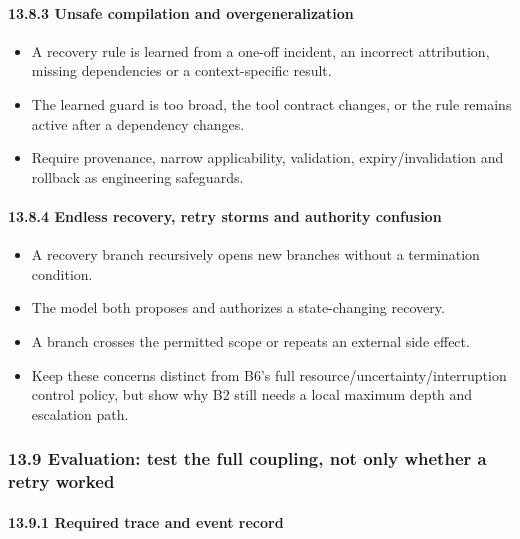 \paragraph{13.8.3 Unsafe compilation and overgeneralization}\label{unsafe-compilation-and-overgeneralization}

\begin{itemize}
\tightlist
\item
  A recovery rule is learned from a one-off incident, an incorrect attribution, missing dependencies or a context-specific result.
\item
  The learned guard is too broad, the tool contract changes, or the rule remains active after a dependency changes.
\item
  Require provenance, narrow applicability, validation, expiry/invalidation and rollback as engineering safeguards.
\end{itemize}

\paragraph{13.8.4 Endless recovery, retry storms and authority confusion}\label{endless-recovery-retry-storms-and-authority-confusion}

\begin{itemize}
\tightlist
\item
  A recovery branch recursively opens new branches without a termination condition.
\item
  The model both proposes and authorizes a state-changing recovery.
\item
  A branch crosses the permitted scope or repeats an external side effect.
\item
  Keep these concerns distinct from B6's full resource/uncertainty/interruption control policy, but show why B2 still needs a local maximum depth and escalation path.
\end{itemize}

\subsubsection{13.9 Evaluation: test the full coupling, not only whether a retry worked}\label{evaluation-test-the-full-coupling-not-only-whether-a-retry-worked}

\paragraph{13.9.1 Required trace and event record}\label{required-trace-and-event-record}

